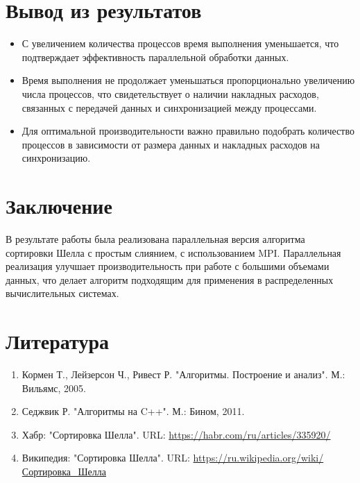 \documentclass[a4paper,12pt]{article}
\begin{document}
\section{Вывод из результатов}
\begin{itemize}
\item С увеличением количества процессов время выполнения уменьшается, что подтверждает эффективность параллельной обработки данных.
\item Время выполнения не продолжает уменьшаться пропорционально увеличению числа процессов, что свидетельствует о  наличии накладных расходов, связанных с передачей данных и синхронизацией между процессами.
\item Для оптимальной производительности важно правильно подобрать количество процессов в зависимости от размера данных и накладных расходов на синхронизацию.
\end{itemize}
\newpage

\section{Заключение}
В результате работы была реализована параллельная версия алгоритма сортировки Шелла с простым слиянием, с использованием MPI. Параллельная реализация улучшает производительность при работе с большими объемами данных, что делает алгоритм подходящим для применения в распределенных вычислительных системах.
\newpage

\section{Литература}
\begin{enumerate}
    \item Кормен Т., Лейзерсон Ч., Ривест Р. "Алгоритмы. Построение и анализ". М.: Вильямс, 2005.
    \item Седжвик Р. "Алгоритмы на C++". М.: Бином, 2011.
    \item Хабр: "Сортировка Шелла". URL: \url{https://habr.com/ru/articles/335920/}
    \item Википедия: "Сортировка Шелла". URL: \url{https://ru.wikipedia.org/wiki/Сортировка_Шелла}
\end{enumerate}
\newpage
\end{document}
